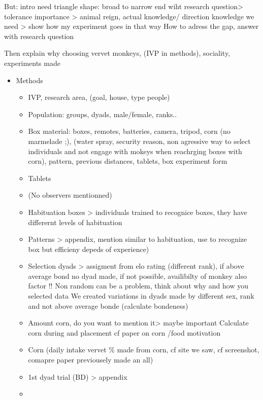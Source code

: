 \documentclass[
]{article}
\begin{document}
But: intro need triangle shape: broad to narrow end wiht research
question\textgreater{} tolerance importance \textgreater{} animal reign,
actual knowledge/ direction knowledge we need \textgreater{} show how my
experiment goes in that way How to adress the gap, answer with research
question

Then explain why choosing vervet monkeys, (IVP in methods), sociality,
experiments made

\begin{itemize}
\item
  Methods

  \begin{itemize}
  \item
    IVP, research area, (goal, house, type people)
  \item
    Population: groups, dyads, male/female, ranks..
  \item
    Box material: boxes, remotes, batteries, camera, tripod, corn (no
    marmelade ;), (water spray, security reason, non agressive way to
    select individuals and not engage with mokeys when reachrging boxes
    with corn), pattern, previous distances, tablets, box experiment
    form
  \item
    Tablets
  \item
    (No observers mentionned)
  \item
    Habituation boxes \textgreater{} individuals trained to recognice
    boxes, they have differernt levels of habituation
  \item
    Patterns \textgreater{} appendix, mention similar to habituation,
    use to recognize box but efficieny depeds of experience)
  \item
    Selection dyads \textgreater{} assigment from elo rating (different
    rank), if above average bond no dyad made, if not possible,
    availibilty of monkey also factor !! Non random can be a problem,
    think about why and how you selected data We created variations in
    dyads made by different sex, rank and not above average bonde
    (calculate bondeness)
  \item
    Amount corn, do you want to mention it\textgreater{} maybe important
    Calculate corn during and placement cf paper on corn /food
    motivation
  \item
    Corn (daily intake vervet \% made from corn, cf site we saw, cf
    screenshot, comapre paper previousely made an all)
  \item
    1st dyad trial (BD) \textgreater{} appendix
  \item

\end{itemize}
\end{itemize}
\end{document}
